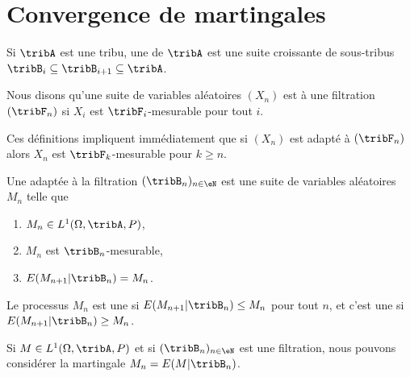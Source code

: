 
\section{Convergence de martingales}

\begin{definition}
	Si \( \tribA\) est une tribu, une  de \( \tribA\) est une suite croissante de sous-tribus \( \tribB_i\subseteq\tribB_{i+1}\subseteq\tribA\).

	Nous disons qu'une suite de variables aléatoires \( (X_n)\) est  à une filtration \( (\tribF_n)\) si \( X_i\) est \( \tribF_i\)-mesurable pour tout \( i\).
\end{definition}

Ces définitions impliquent immédiatement que si \( (X_n)\) est adapté à \( (\tribF_n)\) alors \( X_n\) est \( \tribF_k\)-mesurable pour \( k\geq n\).

\begin{definition}
	Une  adaptée à la filtration \( (\tribB_n)_{n\in \eN}\) est une suite de variables aléatoires \( M_n\) telle que
	\begin{enumerate}
		\item
		      \(M_n\in L^1(\Omega,\tribA,P)\),
		\item
		      \( M_n\) est \( \tribB_n\)-mesurable,
		\item
		      \( E(M_{n+1}|\tribB_n)=M_n\).
	\end{enumerate}

	Le processus \( M_n\) est une  si \( E(M_{n+1}|\tribB_n)\leq M_n\) pour tout \( n\), et c'est une  si \( E(M_{n+1}|\tribB_n)\geq M_n\).
\end{definition}

\begin{example}
	Si \( M\in L^1(\Omega,\tribA,P)\) et si \( (\tribB_n)_{n\in \eN}\) est une filtration, nous pouvons considérer la martingale \( M_n=E(M|\tribB_n)\).
\end{example}

